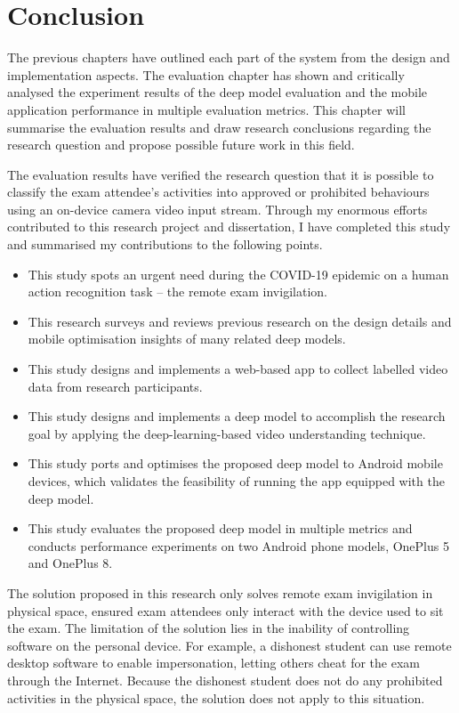 \chapter{Conclusion}
\label{chap:Conclusion}
The previous chapters have outlined each part of the system from the design and implementation aspects.
The evaluation chapter has shown and critically analysed the experiment results of the deep model evaluation and the mobile application performance in multiple evaluation metrics.
This chapter will summarise the evaluation results and draw research conclusions regarding the research question and propose possible future work in this field.

The evaluation results have verified the research question that it is possible to classify the exam attendee's activities into approved or prohibited behaviours using an on-device camera video input stream.
Through my enormous efforts contributed to this research project and dissertation, I have completed this study and summarised my contributions to the following points.

\begin{itemize}[leftmargin=1em]
    \setlength\itemsep{-.5em}
    \item This study spots an urgent need during the COVID-19 epidemic on a human action recognition task -- the remote exam invigilation.
    \item This research surveys and reviews previous research on the design details and mobile optimisation insights of many related deep models.
    \item This study designs and implements a web-based app to collect labelled video data from research participants.
    \item This study designs and implements a deep model to accomplish the research goal by applying the deep-learning-based video understanding technique.
    \item This study ports and optimises the proposed deep model to Android mobile devices, which validates the feasibility of running the app equipped with the deep model.
    \item This study evaluates the proposed deep model in multiple metrics and conducts performance experiments on two Android phone models, OnePlus 5 and OnePlus 8.
\end{itemize}

The solution proposed in this research only solves remote exam invigilation in physical space, ensured exam attendees only interact with the device used to sit the exam.
The limitation of the solution lies in the inability of controlling software on the personal device.
For example, a dishonest student can use remote desktop software to enable impersonation, letting others cheat for the exam through the Internet. 
Because the dishonest student does not do any prohibited activities in the physical space, the solution does not apply to this situation.

